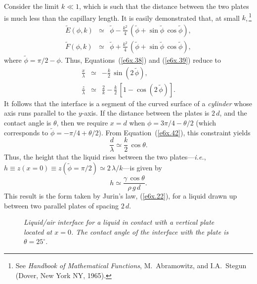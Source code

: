 Consider the limit $k\ll 1$, which is such that the distance between the two plates is much less than the capillary
length. It is easily demonstrated that, at small $k$,\,\footnote{See {\em Handbook of Mathematical Functions}, M.~Abramowitz, and
I.A.~Stegun (Dover, New York NY, 1965).} 
\begin{eqnarray}
\tilde{E}(\phi,k)&\simeq & \tilde{\phi} - \frac{k^2}{4}\,(\tilde{\phi}+\sin\tilde{\phi}\,\cos\tilde{\phi}),\\[0.5ex]
\tilde{F}(\phi,k) &\simeq & \tilde{\phi} + \frac{k^2}{4}\,(\tilde{\phi}+\sin\tilde{\phi}\,\cos\tilde{\phi}),
\end{eqnarray}
where $\tilde{\phi}=\pi/2-\phi$. Thus, Equations~(\ref{e6x.38}) and (\ref{e6x.39}) reduce to
\begin{eqnarray}\label{e6x.42}
\frac{x}{\lambda}&\simeq & -\frac{k}{2}\,\sin(2\,\tilde{\phi}),\\[0.5ex]
\frac{z}{\lambda}&\simeq &\frac{2}{k}-\frac{k}{2}\,[1-\cos(2\,\tilde{\phi})].
\end{eqnarray}
It follows that the interface is a segment of the curved surface of a {\em cylinder}\/ whose axis runs parallel to the
$y$-axis. If the distance between the
plates is $2\,d$, and the contact angle is $\theta$, then we require $x=d$ when $\phi=3\pi/4-\theta/2$ (which
corresponds to $\tilde{\phi}=-\pi/4+\theta/2$). 
From Equation~(\ref{e6x.42}), this constraint yields
\begin{equation}
\frac{d}{\lambda}\simeq \frac{k}{2}\,\cos\theta.
\end{equation}
Thus, the height that the liquid rises between the two plates---{\em i.e.}, $h\equiv z(x=0)\equiv z(\tilde{\phi}=\pi/2)\simeq 2\,\lambda/k$---is given by
\begin{equation}
h \simeq \frac{\gamma\,\cos\theta}{\rho\,g\,d}.
\end{equation}
This result is the form taken by Jurin's law, (\ref{e6x.22}), for a liquid drawn up between two parallel plates
of spacing $2\,d$. 

\begin{figure}
\epsfysize=3.5in
\centerline{}
\caption{\em Liquid/air interface for a liquid in contact with a vertical plate located at $x=0$.
The contact angle of the interface with the plate is $\theta=25^\circ$. }\label{f6x.06}
\end{figure}

